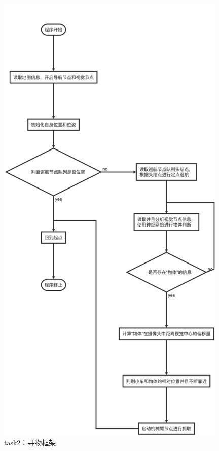 \documentclass[a4paper,twoside]{article}
\begin{document}
\begin{figure}[htbp]
	\begin{center}
		\includegraphics[width=11cm]{task2framework.png}
		\caption{task2：寻物框架}
		\label{task2frame}
	\end{center}
\end{figure}

\newpage
\end{document}

